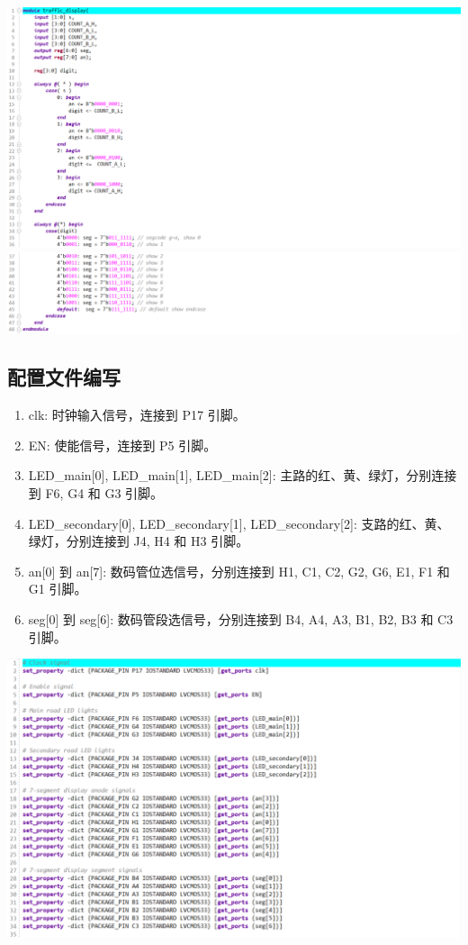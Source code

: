 \documentclass[a4,10pt,zihao=-4]{ctexart}
\begin{document}
\vspace{1em}
\noindent\includegraphics[width=1\textwidth]{traffic_display_1_code.png}
\noindent\includegraphics[width=1\textwidth]{traffic_display_2_code.png}

\subsection{配置文件编写}
\begin{enumerate}
    \item clk: 时钟输入信号，连接到 P17 引脚。
    \item EN: 使能信号，连接到 P5 引脚。
    \item LED\_main[0], LED\_main[1], LED\_main[2]: 主路的红、黄、绿灯，分别连接到 F6, G4 和 G3 引脚。
    \item LED\_secondary[0], LED\_secondary[1], LED\_secondary[2]: 支路的红、黄、绿灯，分别连接到 J4, H4 和 H3 引脚。
    \item an[0] 到 an[7]: 数码管位选信号，分别连接到 H1, C1, C2, G2, G6, E1, F1 和 G1 引脚。
    \item seg[0] 到 seg[6]: 数码管段选信号，分别连接到 B4, A4, A3, B1, B2, B3 和 C3 引脚。
\end{enumerate}

\vspace{1em}
\noindent\includegraphics[width=1\textwidth]{constraint_code.png}
\end{document}
